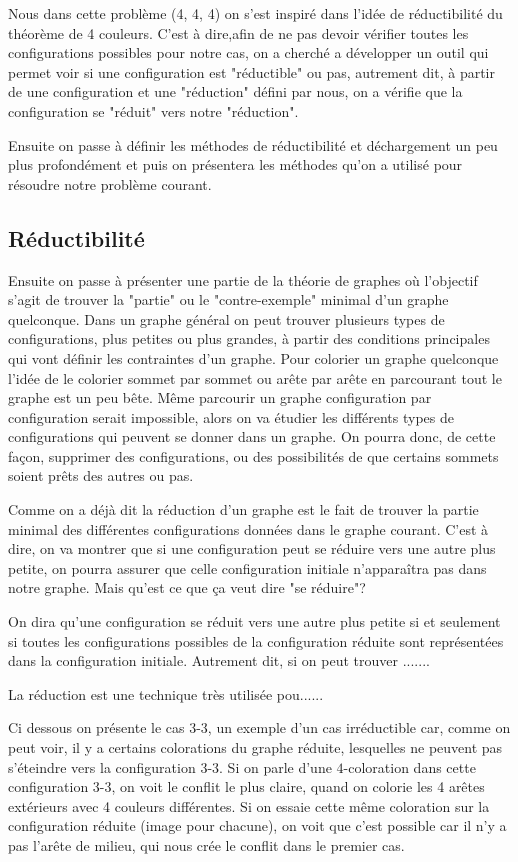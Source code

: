 \documentclass[10pt,a4paper]{article}
\begin{document}
Nous dans cette problème (4, 4, 4) on s'est inspiré dans l'idée de réductibilité du théorème de 4 couleurs. C'est à dire,afin de ne pas devoir vérifier toutes les configurations possibles pour notre cas, on a cherché a développer un outil qui permet voir si une configuration est "réductible" ou pas, autrement dit, à partir de une configuration et une "réduction" défini par nous, on a vérifie que la configuration se "réduit" vers notre "réduction".

Ensuite on passe à définir les méthodes de réductibilité et déchargement un peu plus profondément et puis on présentera les méthodes qu'on a utilisé pour résoudre notre problème courant. 

\subsection{Réductibilité}

Ensuite on passe à présenter une partie de la théorie de graphes où l'objectif s'agit de trouver la "partie" ou le "contre-exemple" minimal d'un graphe quelconque. Dans un graphe général on peut trouver plusieurs types de configurations, plus petites ou plus grandes, à partir des conditions principales qui vont définir les contraintes d'un graphe. Pour colorier un graphe quelconque l'idée de le colorier sommet par sommet ou arête par arête en parcourant tout le graphe est un peu bête. Même parcourir un graphe configuration par configuration serait impossible, alors on va étudier les différents types de configurations qui peuvent se donner dans un graphe. On pourra donc, de cette façon, supprimer des configurations, ou des possibilités de que certains sommets soient prêts des autres ou pas.

Comme on a déjà dit la réduction d'un graphe est le fait de trouver la partie minimal des différentes configurations données dans le graphe courant. C'est à dire, on va montrer que si une configuration peut se réduire vers une autre plus petite, on pourra assurer que celle configuration initiale n'apparaîtra pas dans notre graphe. Mais qu'est ce que ça veut dire "se réduire"?

On dira qu'une configuration se réduit vers une autre plus petite si et seulement si toutes les configurations possibles de la configuration réduite sont représentées dans la configuration initiale. Autrement dit, si on peut trouver .......

La réduction est une technique très utilisée pou...... 

Ci dessous on présente le cas 3-3, un exemple d'un cas irréductible car, comme on peut voir, il y a certains colorations du graphe réduite, lesquelles ne peuvent pas s'éteindre vers la configuration 3-3. Si on parle d'une $4$-coloration dans cette configuration 3-3, on voit le conflit le plus claire, quand on colorie les 4 arêtes extérieurs avec 4 couleurs différentes. Si on essaie cette même coloration sur la configuration réduite (image pour chacune), on voit que c'est possible car il n'y a pas l'arête de milieu, qui nous crée le conflit dans le premier cas. 
\end{document}
